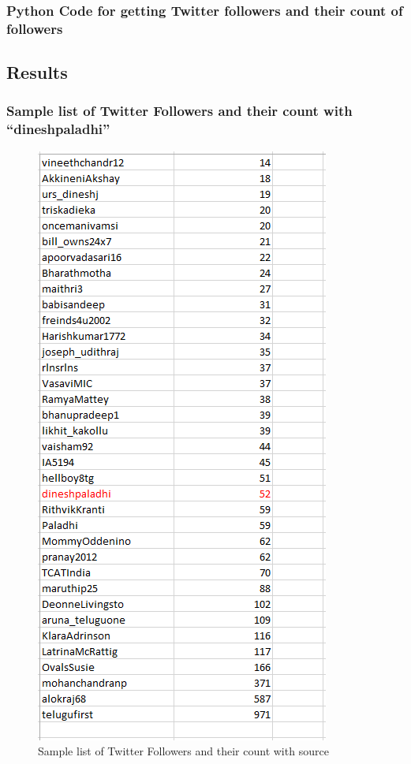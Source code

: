 \subsubsection{Python Code for getting Twitter followers and their count of followers}

\newpage

\subsection{Results}

\subsubsection{Sample list of Twitter Followers and their count with ``dineshpaladhi'' }
\begin{figure}[ht]    
    \begin{center}
        \includegraphics[scale=0.9]{followers_with_source_twt.png}
        \caption{Sample list of Twitter Followers and their count with source}
        \label{Sample_t1}
    \end{center}
\end{figure}
\newpage
